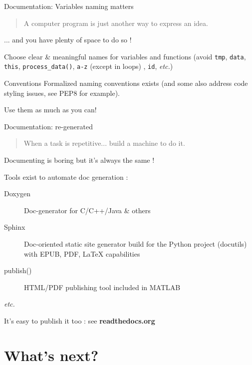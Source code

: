 \documentclass[10pt]{beamer}
\begin{document}
\begin{frame}{Documentation: Variables naming matters} %

	\begin{quotation}
		\noindent A computer program is just another way to express an idea.
	\end{quotation}

	... and you have plenty of space to do so !

	\pause
	\medskip

	Choose clear \& meaningful names for variables and functions  (avoid \texttt{tmp}, \texttt{data}, \texttt{this},
	\texttt{process\_data()}, \texttt{a-z} (except in loops) , \texttt{id}, \textit{etc.})

	\pause
	\medskip

	\begin{block}{Conventions}
		Formalized naming conventions exists (and some also address code styling issues, see
		PEP8 for example).

		Use them as much as you can!
	\end{block}

\end{frame}

\begin{frame}{Documentation: re-generated}

	\begin{quotation}
		When a task is repetitive... build a machine to do it.
	\end{quotation}

	Documenting is boring but it's always the same !

	Tools exist to automate doc generation :

	\begin{description}
		\item[Doxygen] Doc-generator for C/C++/Java \& others
		\item[Sphinx] Doc-oriented static site generator build for the Python project (docutils) with EPUB, PDF, \LaTeX{} capabilities
		\item[publish()] HTML/PDF publishing tool included in MATLAB
		\item[\textit{etc.}]
	\end{description}

	It's easy to publish it too : see \textbf{readthedocs.org}
\end{frame}


\section{What's next?} %
\end{document}
